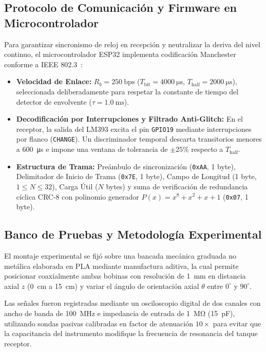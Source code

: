 \subsection{Protocolo de Comunicación y Firmware en Microcontrolador}
\label{subsec:firmware}

Para garantizar sincronismo de reloj en recepción y neutralizar la deriva del nivel continuo, el microcontrolador ESP32 implementa codificación Manchester conforme a IEEE 802.3~\cite{ieee8023manchester}:
\begin{itemize}
    \item \textbf{Velocidad de Enlace:} $R_b = \SI{250}{\text{bps}}$ ($T_{\text{bit}} = \SI{4000}{\micro\second}$, $T_{\text{half}} = \SI{2000}{\micro\second}$), seleccionada deliberadamente para respetar la constante de tiempo del detector de envolvente ($\tau = \SI{1.0}{\milli\second}$).
    \item \textbf{Decodificación por Interrupciones y Filtrado Anti-Glitch:} En el receptor, la salida del LM393 excita el pin \texttt{GPIO19} mediante interrupciones por flanco (\texttt{CHANGE}). Un discriminador temporal descarta transitorios menores a \SI{600}{\micro\second} e impone una ventana de tolerancia de $\pm 25\%$ respecto a $T_{\text{half}}$.
    \item \textbf{Estructura de Trama:} Preámbulo de sincronización (\texttt{0xAA}, 1 byte), Delimitador de Inicio de Trama (\texttt{0x7E}, 1 byte), Campo de Longitud (1 byte, $1 \le N \le 32$), Carga Útil ($N$ bytes) y suma de verificación de redundancia cíclica CRC-8 con polinomio generador $P(x) = x^8 + x^2 + x + 1$ (\texttt{0x07}, 1 byte).
\end{itemize}

\subsection{Banco de Pruebas y Metodología Experimental}
\label{subsec:banco_pruebas}

El montaje experimental se fijó sobre una bancada mecánica graduada no metálica elaborada en PLA mediante manufactura aditiva, la cual permite posicionar coaxialmente ambas bobinas con resolución de \SI{1}{\milli\meter} en distancia axial $z$ (\SI{0}{\centi\meter} a \SI{15}{\centi\meter}) y variar el ángulo de orientación axial $\theta$ entre $0^\circ$ y $90^\circ$.

Las señales fueron registradas mediante un osciloscopio digital de dos canales con ancho de banda de \SI{100}{\mega\hertz} e impedancia de entrada de \SI{1}{\mega\ohm} (\SI{15}{\pico\farad}), utilizando sondas pasivas calibradas en factor de atenuación $10\times$ para evitar que la capacitancia del instrumento modifique la frecuencia de resonancia del tanque receptor.
